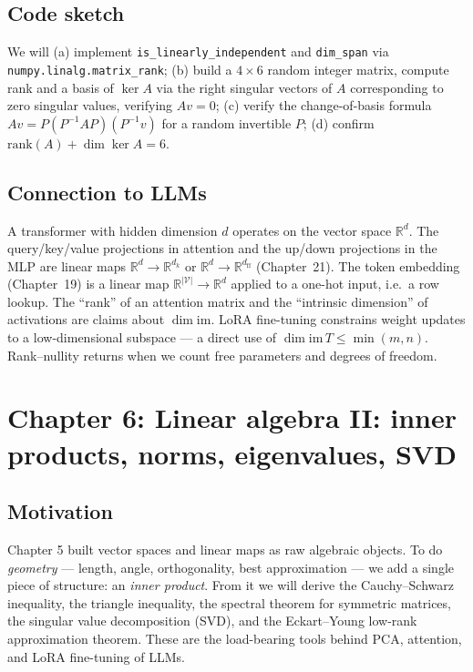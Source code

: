\documentclass[11pt]{article}
\theoremstyle{remark}
\begin{document}
\subsection*{Code sketch}

We will (a) implement \texttt{is\_linearly\_independent} and \texttt{dim\_span} via \texttt{numpy.linalg.matrix\_rank}; (b) build a $4\times 6$ random integer matrix, compute rank and a basis of $\ker A$ via the right singular vectors of $A$ corresponding to zero singular values, verifying $Av = 0$; (c) verify the change-of-basis formula $Av = P(P^{-1}AP)(P^{-1}v)$ for a random invertible $P$; (d) confirm $\mathrm{rank}(A) + \dim\ker A = 6$.

\subsection*{Connection to LLMs}

A transformer with hidden dimension $d$ operates on the vector space $\mathbb{R}^d$. The query/key/value projections in attention and the up/down projections in the MLP are linear maps $\mathbb{R}^d\to\mathbb{R}^{d_k}$ or $\mathbb{R}^d\to\mathbb{R}^{d_{\mathrm{ff}}}$ (Chapter~21). The token embedding (Chapter~19) is a linear map $\mathbb{R}^{|\mathcal{V}|}\to\mathbb{R}^d$ applied to a one-hot input, i.e.\ a row lookup. The ``rank'' of an attention matrix and the ``intrinsic dimension'' of activations are claims about $\dim\mathrm{im}$. LoRA fine-tuning constrains weight updates to a low-dimensional subspace --- a direct use of $\dim\mathrm{im}\,T \le \min(m,n)$. Rank--nullity returns when we count free parameters and degrees of freedom.


\section*{Chapter 6: Linear algebra II: inner products, norms, eigenvalues, SVD}

\subsection*{Motivation}

Chapter 5 built vector spaces and linear maps as raw algebraic objects. To do \emph{geometry} --- length, angle, orthogonality, best approximation --- we add a single piece of structure: an \emph{inner product}. From it we will derive the Cauchy--Schwarz inequality, the triangle inequality, the spectral theorem for symmetric matrices, the singular value decomposition (SVD), and the Eckart--Young low-rank approximation theorem. These are the load-bearing tools behind PCA, attention, and LoRA fine-tuning of LLMs.
\end{document}

